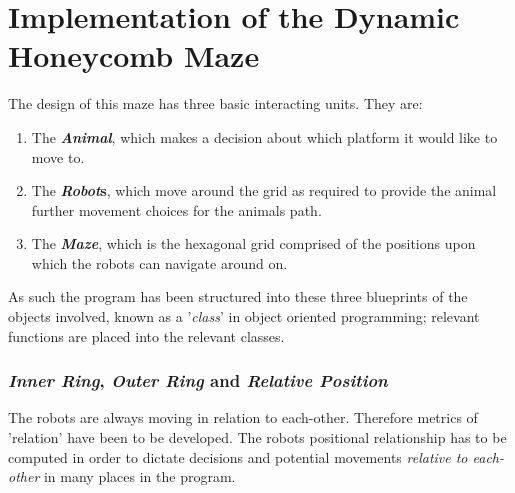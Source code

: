 \section{Implementation of the Dynamic Honeycomb Maze}
\label{section:implementation}
The design of this maze has three basic interacting units.
They are:
\begin{enumerate}
    \item The \textbf{\textit{Animal}}, which makes a decision about which platform it would like to move to.
    \item The \textbf{\textit{Robot}s}, which move around the grid as required to provide the animal further movement choices for the animals path.
    \item The \textbf{\textit{Maze}}, which is the hexagonal grid comprised of the positions upon which the robots can navigate around on.
\end{enumerate}


As such the program has been structured into these three blueprints of the objects involved, known as a '\textit{class}' in object oriented programming; relevant functions are placed into the relevant classes.

\subsubsection{\textit{Inner Ring}, \textit{Outer Ring} and \textit{Relative Position}}



The robots are always moving in relation to each-other. Therefore metrics of 'relation' have been to be developed. The robots positional relationship has to be computed in order to dictate decisions and potential movements \textit{relative to each-other} in many places in the program.

